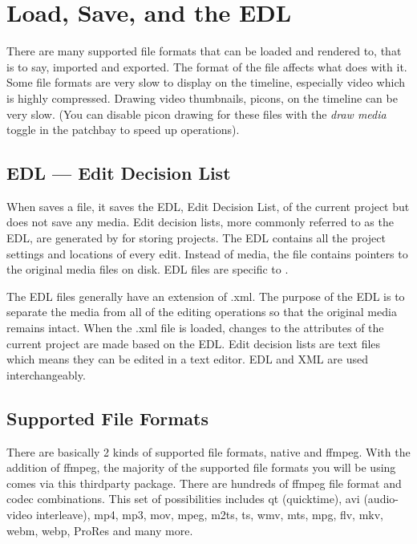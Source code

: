 \chapter{Load, Save, and the EDL}%
\label{cha:load_save_and_the_EDL}

There are many supported file formats that can be loaded and rendered to, that is to say, imported and exported. 
The format of the file affects what \CGG{} does with it.  
Some file formats are very slow to display on the timeline, especially video which is highly compressed.  
Drawing video thumbnails, picons, on the timeline can be very slow.  (You can disable picon drawing for these files with the \textit{draw media} toggle in the patchbay to speed up operations).

\section{EDL --- Edit Decision List}%
\label{sec:edl_edit_decision_list}

When \CGG{} saves a file, it saves the EDL, Edit Decision List, of the current project but does not save any media. 
Edit decision lists, more commonly referred to as the EDL, are generated by \CGG{} for storing projects.  
The EDL contains all the project settings and locations of every edit. 
Instead of media, the file contains pointers to the original media files on disk.  
EDL files are specific to \CGG{}.    

The EDL files generally have an extension of .xml.  
The purpose of the EDL is to separate the media from all of the editing operations so that the original media remains intact. 
When the .xml file is loaded, changes to the attributes of the current project are made based on the EDL. Edit decision lists are text files which means they can be edited in a text editor.  EDL and XML are used interchangeably.

\section{Supported File Formats}%
\label{sec:supported_file_formats}

There are basically 2 kinds of supported file formats, native and ffmpeg.  With the addition of ffmpeg, the majority of the supported file formats you will be using comes via this thirdparty package.  There are hundreds of ffmpeg file format and codec combinations. This set of possibilities includes qt (quicktime), avi (audio-video interleave),  mp4, mp3, mov, mpeg, m2ts, ts, wmv, mts, mpg, flv, mkv, webm, webp, ProRes and many more.

